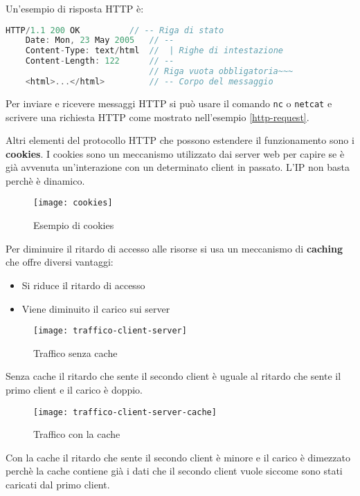 \documentclass[a4paper]{article}
\begin{document}
\begin{example}
  Un'esempio di risposta HTTP è:
  \begin{lstlisting}[language=Scala]
    HTTP/1.1 200 OK          // -- Riga di stato
    Date: Mon, 23 May 2005   // -- 
    Content-Type: text/html  //  | Righe di intestazione
    Content-Length: 122      // -- 
                             // Riga vuota obbligatoria~~~
    <html>...</html>         // -- Corpo del messaggio
  \end{lstlisting}
\end{example}

\noindent
Per inviare e ricevere messaggi HTTP si può usare il comando \texttt{nc} o \texttt{netcat}
e scrivere una richiesta HTTP come mostrato nell'esempio \ref{http-request}.

\vspace{1em}
\noindent
Altri elementi del protocollo HTTP che possono estendere il funzionamento sono i \textbf{
cookies}. I cookies sono un meccanismo utilizzato dai server web per capire se è già
avvenuta un'interazione con un determinato client in passato. L'IP non basta perchè
è dinamico.
\begin{figure}[H]
  \centering
  \texttt{[image: cookies]}
  \caption{Esempio di cookies}
\end{figure}

\vspace{1em}
\noindent
Per diminuire il ritardo di accesso alle risorse si usa un meccanismo di \textbf{caching}
che offre diversi vantaggi:
\begin{itemize}
  \item Si riduce il ritardo di accesso
  \item Viene diminuito il carico sui server
\end{itemize}
\begin{figure}[H]
  \centering
  \texttt{[image: traffico-client-server]}
  \caption{Traffico senza cache}
\end{figure}
\noindent
Senza cache il ritardo che sente il secondo client è uguale al ritardo che sente il primo client e il
carico è doppio.
\begin{figure}[H]
  \centering
  \texttt{[image: traffico-client-server-cache]}
  \caption{Traffico con la cache}
\end{figure}
\noindent
Con la cache il ritardo che sente il secondo client è minore e il carico è dimezzato 
perchè la cache contiene già i dati che il secondo client vuole siccome sono stati
caricati dal primo client.
\end{document}
